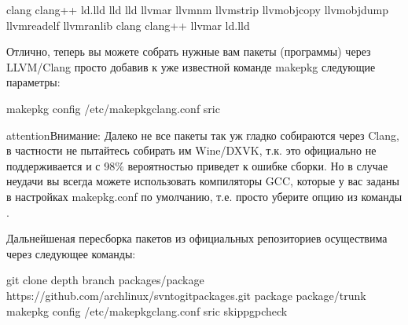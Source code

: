 \documentclass[letterpaper,10pt,russian,openany]{sphinxmanual}
\begin{document}
\begin{sphinxVerbatim}[commandchars=\\\{\}]
 clang
 clang++
 ld.lld
 lld
 lld
 llvm\PYGZhy{}ar
 llvm\PYGZhy{}nm
 llvm\PYGZhy{}strip
 llvm\PYGZhy{}objcopy
 llvm\PYGZhy{}objdump
 llvm\PYGZhy{}readelf
 llvm\PYGZhy{}ranlib
 clang
 clang++
 llvm\PYGZhy{}ar
 ld.lld
\end{sphinxVerbatim}

\sphinxAtStartPar
Отлично, теперь вы можете собрать нужные вам пакеты (программы) через LLVM/Clang просто добавив к уже известной команде makepkg следующие параметры:

\begin{sphinxVerbatim}[commandchars=\\\{\}]
makepkg \PYGZhy{}\PYGZhy{}config /etc/makepkg\PYGZhy{}clang.conf \PYGZhy{}sric
\end{sphinxVerbatim}

\begin{sphinxadmonition}{attention}{Внимание:}
\sphinxAtStartPar
Далеко не все пакеты так уж гладко собираются через Clang, в частности не пытайтесь собирать им Wine/DXVK,
т.к. это официально не поддерживается и с 98\% вероятностью приведет к ошибке сборки.
Но в случае неудачи вы всегда можете использовать компиляторы GCC, которые у вас заданы в настройках makepkg.conf по умолчанию,
т.е. просто уберите опцию  из команды .
\end{sphinxadmonition}

\sphinxAtStartPar
Дальнейшеная пересборка пакетов из официальных репозиториев осуществима через следующее команды:

\begin{sphinxVerbatim}[commandchars=\\\{\}]
git clone \PYGZhy{}\PYGZhy{}depth  \PYGZhy{}\PYGZhy{}branch packages/package https://github.com/archlinux/svntogit\PYGZhy{}packages.git package
 package/trunk
makepkg \PYGZhy{}\PYGZhy{}config /etc/makepkg\PYGZhy{}clang.conf \PYGZhy{}sric \PYGZhy{}\PYGZhy{}skippgpcheck
\end{sphinxVerbatim}
\end{document}
